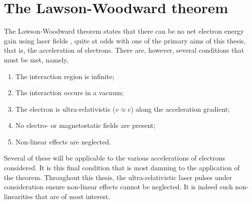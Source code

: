 
\section{The Lawson-Woodward theorem}\label{sec:intro-lawson_woodward}
The Lawson-Woodward theorem states that there can be no net electron energy gain using laser fields \cite{esareyPhysicsLaserdrivenPlasmabased2009}, quite at odds with one of the primary aims of this thesis, that is, the acceleration of electrons. There are, however, several conditions that must be met, namely,
\begin{enumerate}
	\item The interaction region is infinite;
	\item The interaction  occurs in a vacuum;
	\item The electron is ultra-relativistic ($v\approx c$) along the acceleration gradient;
	\item No electro- or magnetostatic fields are present;
	\item Non-linear effects are neglected.
\end{enumerate}
Several of these will be applicable to the various accelerations of electrons considered. It is this final condition that is most damning to the application of the theorem. Throughout this thesis, the ultra-relativistic laser pulses under consideration ensure non-linear effects cannot be neglected. It is indeed such non-linearities that are of most interest.


